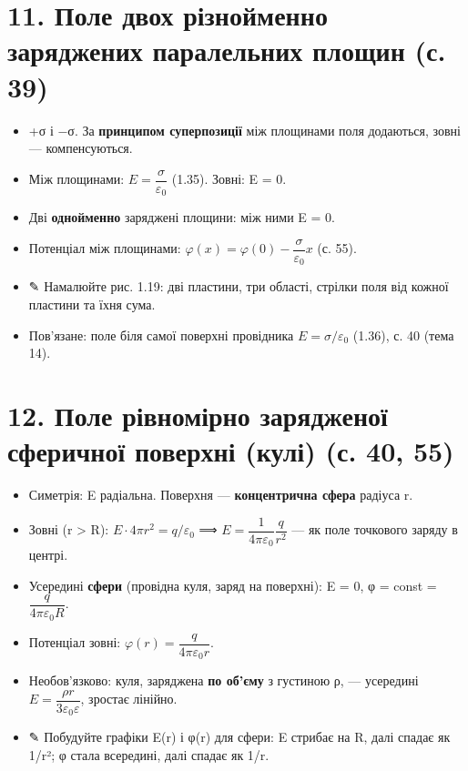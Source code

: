 \documentclass[11pt,a4paper,oneside]{book}
\newcommand{\pen}{{\sffamily\color{accent}✎}}
\begin{document}
\section*{11. Поле двох різнойменно заряджених паралельних площин (с. 39)}
\begin{itemize}
\item +σ і −σ. За \textbf{принципом суперпозиції} між площинами поля додаються, зовні — компенсуються.
\item Між площинами: $E = \dfrac{\sigma}{\varepsilon_0}$ (1.35). Зовні: E = 0.
\item Дві \textbf{однойменно} заряджені площини: між ними E = 0.
\item Потенціал між площинами: $\varphi(x) = \varphi(0) - \dfrac{\sigma}{\varepsilon_0}x$ (с. 55).
\item \pen{} Намалюйте рис. 1.19: дві пластини, три області, стрілки поля від кожної пластини та їхня сума.
\item Пов'язане: поле біля самої поверхні провідника $E = \sigma/\varepsilon_0$ (1.36), с. 40 (тема 14).
\end{itemize}

\section*{12. Поле рівномірно зарядженої сферичної поверхні (кулі) (с. 40, 55)}
\begin{itemize}
\item Симетрія: E радіальна. Поверхня — \textbf{концентрична сфера} радіуса r.
\item Зовні (r > R): $E\cdot4\pi r^2 = q/\varepsilon_0$ ⟹ $E = \dfrac{1}{4\pi\varepsilon_0}\dfrac{q}{r^2}$ — як поле точкового заряду в центрі.
\item Усередині \textbf{сфери} (провідна куля, заряд на поверхні): E = 0, φ = const = $\dfrac{q}{4\pi\varepsilon_0R}$.
\item Потенціал зовні: $\varphi(r) = \dfrac{q}{4\pi\varepsilon_0 r}$.
\item Необов'язково: куля, заряджена \textbf{по об'єму} з густиною ρ, — усередині $E = \dfrac{\rho r}{3\varepsilon_0\varepsilon}$, зростає лінійно.
\item \pen{} Побудуйте графіки E(r) і φ(r) для сфери: E стрибає на R, далі спадає як 1/r²; φ стала всередині, далі спадає як 1/r.
\end{itemize}
\end{document}
